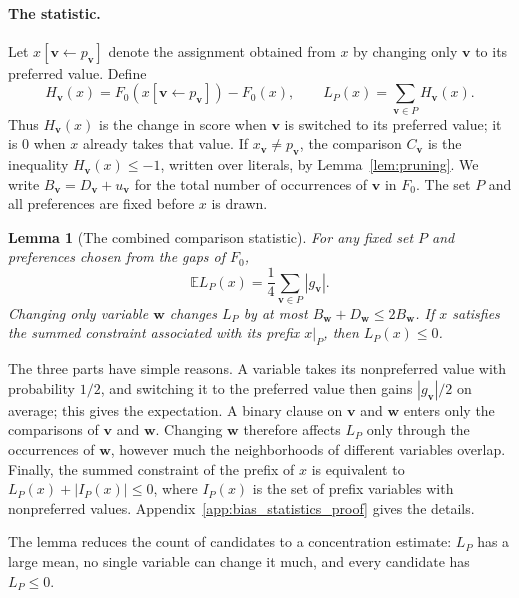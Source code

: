 \documentclass[11pt,a4paper]{article}
\newtheorem{lemma}[theorem]{Lemma}
\theoremstyle{definition}
\theoremstyle{remark}
\newcommand{\E}{\mathbb E}
\begin{document}
\paragraph{The statistic.}
Let $x[\mathbf v\gets p_{\mathbf v}]$ denote the assignment obtained from
$x$ by changing only $\mathbf v$ to its preferred value. Define
\begin{equation}
 H_{\mathbf v}(x)=F_0(x[\mathbf v\gets p_{\mathbf v}])-F_0(x),
 \qquad L_P(x)=\sum_{\mathbf v\in P}H_{\mathbf v}(x).
 \label{eq:bias_statistic}
\end{equation}
Thus $H_{\mathbf v}(x)$ is the change in score when $\mathbf v$ is switched
to its preferred value; it is $0$ when $x$ already takes that value. If
$x_{\mathbf v}\ne p_{\mathbf v}$, the comparison $C_{\mathbf v}$ is the
inequality $H_{\mathbf v}(x)\le-1$, written over literals, by
Lemma~\ref{lem:pruning}. We write
$B_{\mathbf v}=D_{\mathbf v}+u_{\mathbf v}$ for the total number of
occurrences of $\mathbf v$ in $F_0$. The set $P$ and all preferences are
fixed before $x$ is drawn.

\begin{lemma}[The combined comparison statistic]\label{lem:bias_statistics}
For any fixed set $P$ and preferences chosen from the gaps of $F_0$,
\[
 \E L_P(x)=\frac14\sum_{\mathbf v\in P}|g_{\mathbf v}|.
\]
Changing only variable $\mathbf w$ changes $L_P$ by at most
$B_{\mathbf w}+D_{\mathbf w}\le2B_{\mathbf w}$.
If $x$ satisfies the summed constraint associated with its prefix $x|_P$,
then $L_P(x)\le0$.
\end{lemma}

The three parts have simple reasons. A variable takes its nonpreferred
value with probability $1/2$, and switching it to the preferred value
then gains $|g_{\mathbf v}|/2$ on average; this gives the expectation. A binary
clause on $\mathbf v$ and $\mathbf w$ enters only the comparisons of
$\mathbf v$ and $\mathbf w$. Changing $\mathbf w$ therefore affects $L_P$
only through the occurrences of $\mathbf w$, however much the
neighborhoods of different variables overlap. Finally, the summed
constraint of the prefix of $x$ is equivalent to $L_P(x)+|I_P(x)|\le0$,
where $I_P(x)$ is the set of prefix variables with nonpreferred values.
Appendix~\ref{app:bias_statistics_proof} gives the details.

The lemma reduces the count of candidates to a concentration estimate:
$L_P$ has a large mean, no single variable can change it much, and every
candidate has $L_P\le0$.
\end{document}
